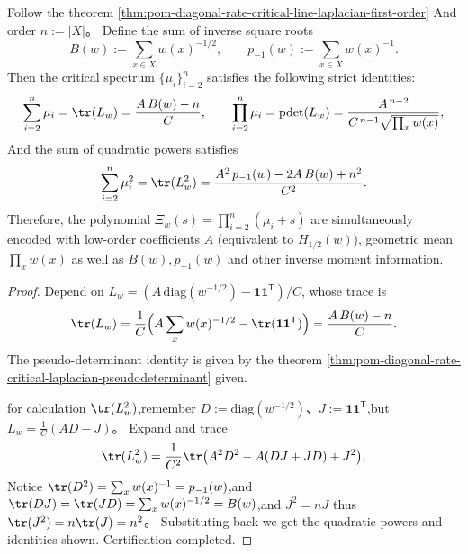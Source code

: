 \begin{proposition}\label{prop:pom-diagonal-rate-critical-spectrum-invariants-closed}
Follow the theorem \ref{thm:pom-diagonal-rate-critical-line-laplacian-first-order} And order \(n:=|X|\)。
Define the sum of inverse square roots
\[
B(w):=\sum_{x\in X}w(x)^{-1/2},
\qquad
p_{-1}(w):=\sum_{x\in X}w(x)^{-1}.
\]
Then the critical spectrum \(\{\mu_i\}_{i=2}^n\) satisfies the following strict identities:
\[
\sum_{i=2}^{n}\mu_i=\tr(L_w)=\frac{A\,B(w)-n}{C},
\qquad
\prod_{i=2}^{n}\mu_i=\operatorname{pdet}(L_w)=\frac{A^{\,n-2}}{C^{\,n-1}\sqrt{\prod_x w(x)}},
\]
And the sum of quadratic powers satisfies
\[
\sum_{i=2}^{n}\mu_i^2=\tr(L_w^2)=\frac{A^2\,p_{-1}(w)-2A\,B(w)+n^2}{C^2}.
\]
Therefore, the polynomial \(\Xi_w(s)=\prod_{i=2}^{n}(\mu_i+s)\) are simultaneously encoded with low-order coefficients \(A\) (equivalent to \(H_{1/2}(w)\)), geometric mean \(\prod_x w(x)\) as well as \(B(w),p_{-1}(w)\) and other inverse moment information.
\end{proposition}
\begin{proof}
Depend on \(L_w=(A\,\mathrm{diag}(w^{-1/2})-\mathbf 1\mathbf 1^{\mathsf T})/C\), whose trace is
\[
\tr(L_w)=\frac{1}{C}\Bigl(A\sum_x w(x)^{-1/2}-\tr(\mathbf 1\mathbf 1^{\mathsf T})\Bigr)
=\frac{A\,B(w)-n}{C}.
\]
The pseudo-determinant identity is given by the theorem \ref{thm:pom-diagonal-rate-critical-laplacian-pseudodeterminant} given.
\par
for calculation \(\tr(L_w^2)\),remember \(D:=\mathrm{diag}(w^{-1/2})\)、\(J:=\mathbf 1\mathbf 1^{\mathsf T}\),but
\(
L_w=\frac{1}{C}(AD-J)
\)。
Expand and trace
\[
\tr(L_w^2)
=\frac{1}{C^2}\tr\bigl(A^2D^2-A(DJ+JD)+J^2\bigr).
\]
Notice \(\tr(D^2)=\sum_x w(x)^{-1}=p_{-1}(w)\),and \(\tr(DJ)=\tr(JD)=\sum_x w(x)^{-1/2}=B(w)\),and \(J^2=nJ\) thus \(\tr(J^2)=n\tr(J)=n^2\)。
Substituting back we get the quadratic powers and identities shown. Certification completed.
\end{proof}

